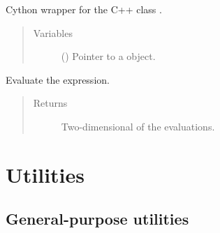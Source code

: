 \documentclass[letterpaper,10pt,english]{sphinxmanual}
\begin{document}
\begin{fulllineitems}
\label{\detokenize{api:grids.parser.parser_2d.Parser2d}}
Cython wrapper for the C++ class .
\begin{quote}\begin{description}
\item[{Variables}] \leavevmode
{} () \textendash{} Pointer to a  object.

\end{description}\end{quote}

\begin{fulllineitems}
\label{\detokenize{api:grids.parser.parser_2d.Parser2d.evaluate}}
Evaluate the expression.
\begin{quote}\begin{description}
\item[{Returns}] \leavevmode
Two-dimensional  of the evaluations.

\end{description}\end{quote}

\end{fulllineitems}


\end{fulllineitems}



\section{Utilities}
\label{\detokenize{api:utilities}}

\subsection{General-purpose utilities}
\label{\detokenize{api:module-tasmania.set_namelist}}\label{\detokenize{api:general-purpose-utilities}}
\end{document}
